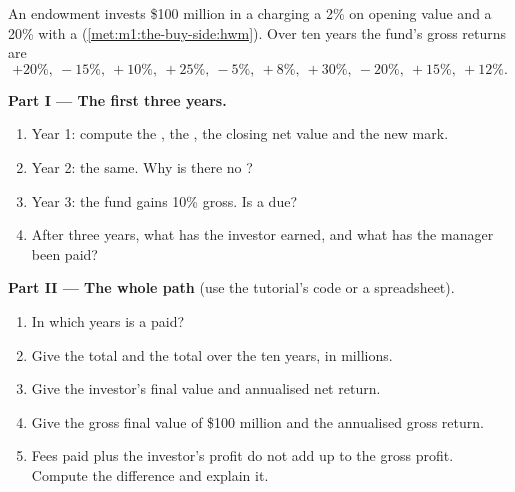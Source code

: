 \begin{problem}\label{pb:m1:the-buy-side:1}
An endowment invests \$100 million in a  charging a 2\%  on opening value and a 20\%  with a 
(\cref{met:m1:the-buy-side:hwm}). Over ten years the fund's gross returns
are
\[
+20\%,\ -15\%,\ +10\%,\ +25\%,\ -5\%,\ +8\%,\ +30\%,\ -20\%,\ +15\%,\ +12\%.
\]

\medskip\noindent\textbf{Part I --- The first three years.}
\begin{enumerate}
\item Year 1: compute the , the , the closing
net value and the new mark.
\item Year 2: the same. Why is there no ?
\item Year 3: the fund gains 10\% gross. Is a  due?
\item After three years, what has the investor earned, and what has the
manager been paid?
\end{enumerate}

\medskip\noindent\textbf{Part II --- The whole path} (use the tutorial's code
or a spreadsheet).
\begin{enumerate}[resume]
\item In which years is a  paid?
\item Give the total  and the total  over
the ten years, in millions.
\item Give the investor's final value and annualised net return.
\item Give the gross final value of \$100 million and the annualised gross
return.
\item Fees paid plus the investor's profit do not add up to the gross
profit. Compute the difference and explain it.
\end{enumerate}


\end{problem}

